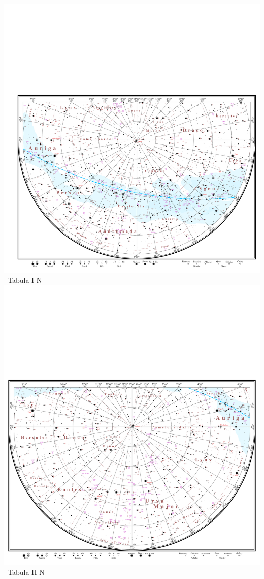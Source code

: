 \documentclass[10pt,landscape,oneside]{article}
\begin{document}
\begin{center}
\noindent\includegraphics[height=\textheight,trim= 0.0cm 0.0cm 0.0cm 14.35cm,clip]{TabulaI.pdf}\\[-1.025\textheight]\hfill\large~Tabula I-N\hspace{7mm}
\clearpage
%
\noindent\includegraphics[height=\textheight,trim= 0.0cm 0.0cm 0.0cm 14.35cm,clip]{TabulaII.pdf}\\[-1.025\textheight]\hfill\large~Tabula II-N\hspace{15mm}

\end{center}
\end{document}
